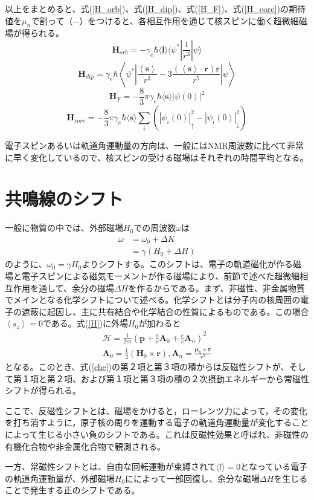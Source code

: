 \documentclass[11pt,a4j]{jreport}
\begin{document}
以上をまとめると、式(\ref{H_orb})、式(\ref{H_dip})、式(\ref{H_F})、式(\ref{H_core})の期待値を$\mu_n$で割って（$-$）をつけると、各相互作用を通じて核スピンに働く超微細磁場が得られる。
\begin{equation}
  \bm{H}_{orb} = -\gamma_e\hbar \langle \bm{l} \rangle \langle \psi^*|\frac{1}{r^3}|\psi \rangle 
\end{equation}
\begin{equation}
  \bm{H}_{dip} = \gamma_e\hbar \left\langle \psi^* \left|\frac{\left\langle\bm{s}\right\rangle}{r^3}-3\frac{(\left\langle \bm s\right\rangle \cdot \bm r)\bm{r} }{r^5} \right| \psi \right\rangle
\end{equation}
\begin{equation}
  \bm{H}_F = -\frac{8}{3}\pi \gamma_e \hbar \langle \bm{s}\rangle |\psi(0)|^2
  \label{H_F_2}
\end{equation}
\begin{equation}
  \bm{H}_{core} = -\frac{8}{3}\pi \gamma_e \hbar \langle \bm{s}\rangle \sum_{i}{(|\psi_i(0)|_\uparrow^2-|\psi_i(0)|_\downarrow^2 )}
\end{equation}
\par
電子スピンあるいは軌道角運動量の方向は、一般にはNMR周波数に比べて非常に早く変化しているので、核スピンの受ける磁場はそれぞれの時間平均となる。
\section{共鳴線のシフト}
一般に物質の中では、外部磁場$H_0$での周波数$\omega$は
\begin{align}
  \omega &= \omega_0 + \Delta K \\
  &= \gamma(H_0+\Delta H)
\end{align}
のように、$\omega_0=\gamma H_0$よりシフトする。このシフトは、電子の軌道磁化が作る磁場と電子スピンによる磁気モーメントが作る磁場により、前節で述べた超微細相互作用を通して、余分の磁場$\Delta H$を作るからである。まず、非磁性、非金属物質でメインとなる化学シフトについて述べる。化学シフトとは分子内の核周囲の電子の遮蔽に起因し、主に共有結合や化学結合の性質によるものである。この場合$\left\langle s_z \right\rangle = 0$である。式(\ref{H})に外場$H_0$が加わると
\begin{align}
  \mathcal{H} = \frac{1}{2m}(\bm p + \frac{e}{c} \bm A_0 +\frac{e}{c} \bm A_n)^2\\
  \bm A_0 =\frac{1}{2}(\bm H_0 \times \bm r), \bm A_n = \frac{\bm{\mu}_n \times \bm r}{r^3}
  \label{che}
\end{align}
となる。このとき、式(\ref{che})の第２項と第３項の積からは反磁性シフトが、そして第１項と第２項、および第１項と第３項の積の２次摂動エネルギーから常磁性シフトが得られる。\par
ここで、反磁性シフトとは、磁場をかけると，ローレンツ力によって，その変化を打ち消すように，原子核の周りを運動する電子の軌道角運動量が変化することによって生じる小さい負のシフトである。これは反磁性効果と呼ばれ、非磁性の有機化合物や非金属化合物で観測される。\par
一方、常磁性シフトとは、自由な回転運動が束縛されて$\langle l \rangle =0$となっている電子の軌道角運動量が、外部磁場$H_0$にによって一部回復し、余分な磁場$\Delta H$を生じることで発生する正のシフトである。
\end{document}
